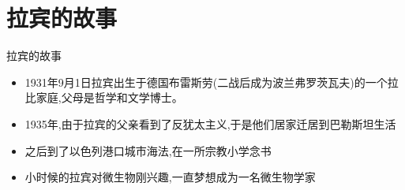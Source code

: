 \documentclass{beamer}
\begin{document}
\section{拉宾的故事}
\begin{frame}{拉宾的故事}
\begin{itemize}
\item<1-> 1931年9月1日拉宾出生于德国布雷斯劳(二战后成为波兰弗罗茨瓦夫)的一个拉比家庭,父母是哲学和文学博士。
\item<3-> 1935年,由于拉宾的父亲看到了反犹太主义,于是他们居家迁居到巴勒斯坦生活
\item<5-> 之后到了以色列港口城市海法,在一所宗教小学念书
\item<6-> 小时候的拉宾对微生物刚兴趣,一直梦想成为一名微生物学家
\end{itemize}
\begin{figure}[htbp]
\end{figure}
\end{frame}
\end{document}
